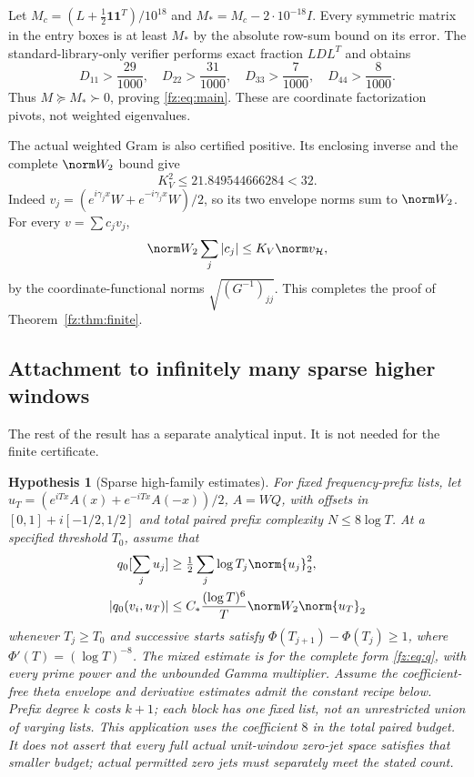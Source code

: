 \documentclass[11pt,a4paper]{article}
\numberwithin{equation}{section}
\newtheorem{hypothesis}[theorem]{Hypothesis}
\theoremstyle{definition}\newtheorem{definition}[theorem]{Definition}
\theoremstyle{remark}\newtheorem{remark}[theorem]{Remark}
\newcommand{\Hh}{\mathcal H}\newcommand{\Hw}{\mathcal H}
\begin{document}
Let $M_c=(L+\frac12\boldsymbol1\boldsymbol1^T)/10^{18}$ and
$M_*=M_c-2\cdot10^{-18}I$. Every symmetric matrix in the entry boxes
is at least $M_*$ by the absolute row-sum bound on its error. The
standard-library-only verifier performs exact fraction $LDL^T$ and obtains
\begin{equation}\label{fz:eq:pivots}
 D_{11}>\frac{29}{1000},\quad D_{22}>\frac{31}{1000},\quad
 D_{33}>\frac7{1000},\quad D_{44}>\frac8{1000}.
\end{equation}
Thus $M\succeq M_*\succ0$, proving \eqref{fz:eq:main}.
These are coordinate factorization pivots, not weighted eigenvalues.

The actual weighted Gram is also certified positive. Its enclosing inverse
and the complete $\norm W_2$ bound give
\[
 K_V^2\le21.849544666284<32.
\]
Indeed $v_j=(e^{i\gamma_jx}W+e^{-i\gamma_jx}W)/2$, so its two envelope
norms sum to $\norm W_2$. For every $v=\sum c_jv_j$,
\begin{equation}\label{fz:eq:gram-coords}
 \norm W_2\sum_j|c_j|\le K_V\norm v_{\Hh},
\end{equation}
by the coordinate-functional norms $\sqrt{(G^{-1})_{jj}}$.
This completes the proof of Theorem~\ref{fz:thm:finite}.

\subsection{Attachment to infinitely many sparse higher windows}

The rest of the result has a separate analytical input. It is not needed
for the finite certificate.

\begin{hypothesis}[Sparse high-family estimates]\label{fz:hyp:sparse}
For fixed frequency-prefix lists, let
$u_T=(e^{iTx}A(x)+e^{-iTx}A(-x))/2$, $A=WQ$, with offsets in
$[0,1]+i[-1/2,1/2]$ and total paired prefix complexity $N\le8\log T$.
At a specified threshold $T_0$, assume that
\begin{align}
 q_0[\sum_j u_j]&\ge\tfrac12\sum_j\log T_j\norm{u_j}_2^2,\label{fz:eq:sparse-pos}\\
 |q_0(v_i,u_T)|&\le C_*\frac{(\log T)^6}{T}\norm W_2\norm{u_T}_2\label{fz:eq:mixed}
\end{align}
whenever $T_j\ge T_0$ and successive starts satisfy
$\Phi(T_{j+1})-\Phi(T_j)\ge1$, where
$\Phi'(T)=(\log T)^{-8}$. The mixed estimate is for the complete form
\eqref{fz:eq:q}, with every prime power and the unbounded Gamma multiplier.
Assume the coefficient-free theta envelope and derivative estimates admit
the constant recipe below. Prefix degree $k$ costs $k+1$; each block has
one fixed list, not an unrestricted union of varying lists. This application
uses the coefficient $8$ in the total paired budget. It does not assert
that every full actual unit-window zero-jet space satisfies that smaller
budget; actual permitted zero jets must separately meet the stated count.
\end{hypothesis}
\end{document}
